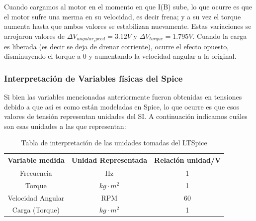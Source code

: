 \documentclass[e4_tp3_main.tex]{subfiles}
\begin{document}
Cuando cargamos al motor en el momento en que I(B) sube, lo que ocurre es que el motor sufre una merma en su velocidad, es decir frena; y a su vez el torque aumenta hasta que ambos valores se estabilizan nuevamente. Estas variaciones se arrojaron valores de $\Delta V_{angular_speed}=3.12 V$ y $\Delta V_{torque}=1.795 V$.
Cuando la carga es liberada (es decir se deja de drenar corriente), ocurre el efecto opuesto, disminuyendo el torque a 0 y aumentando la velocidad angular a la original.
\subsubsection{Interpretación de Variables físicas del Spice}
Si bien las variables mencionadas anteriormente fueron obtenidas en tensiones debido a que así es como están modeladas en Spice, lo que ocurre es que esos valores de tensión representan unidades del SI. A continuación indicamos cuáles son esas unidades a las que representan:

\begin{table}[H]
\centering
\begin{tabular}{@{}ccc@{}}

Variable medida   & Unidad Representada     & Relación unidad/V \\ \midrule
Frecuencia        & Hz                      & 1                 \\
Torque            & $kg \cdot m^2$ & 1                 \\
Velocidad Angular & RPM                     & 60                \\
Carga (Torque)    & $kg \cdot m^2$ & 1                 \\ \bottomrule
\end{tabular}
\caption{Tabla de interpretación de las unidades tomadas del LTSpice}
\end{table}
\end{document}
